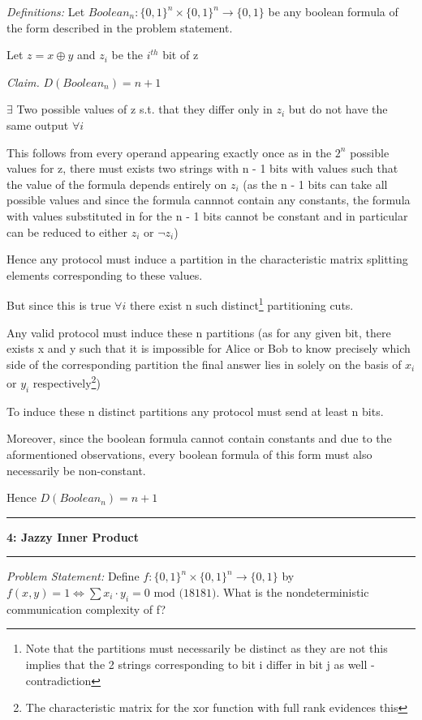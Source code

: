 \documentclass[11pt]{article}
\newcommand\question[2]{\vspace{.25in}\hrule\textbf{#1: #2}\vspace{.5em}\hrule\vspace{.10in}}
\newcommand\problem{\emph{Problem Statement:}\newline}
\newcommand\definitions{\emph{Definitions:}\newline}
\newcommand\claim{\emph{Claim.}\newline}
\begin{document}
\definitions
Let $Boolean_n: {\{0, 1\}}^n \times {\{0, 1\}}^n \to \{0, 1\}$ be any boolean formula of the form described in the problem statement. 

Let $z = x \oplus y$ and $z_i$ be the $i^{th}$ bit of z

\claim
$D(Boolean_n) = n + 1$ 

\proof 
$\exists$ Two possible values of z s.t. that they differ only in $z_i$ but do not have the same output $\forall i$

This follows from every operand appearing exactly once as in the $2^n$ possible values for z, there must exists two strings with n - 1 bits with values such that the value of the formula depends entirely on $z_i$ (as the n - 1 bits can take all possible values and since the formula cannnot contain any constants, the formula with values substituted in for the n - 1 bits cannot be constant and in particular can be reduced to either $z_i$ or $\lnot z_i$)

Hence any protocol must induce a partition in the characteristic matrix splitting elements corresponding to these values.

But since this is true $\forall i$ there exist n such distinct\footnote{Note that the partitions must necessarily be distinct as they are not this implies that the 2 strings corresponding to bit i differ in bit j as well - contradiction} partitioning cuts. 

Any valid protocol must induce these n partitions (as for any given bit, there exists x and y such that it is impossible for Alice or Bob to know precisely which side of the corresponding partition the final answer lies in solely on the basis of $x_i$ or $y_i$ respectively\footnote{The characteristic matrix for the xor function with full rank evidences this})

To induce these n distinct partitions any protocol must send at least n bits.

Moreover, since the boolean formula cannot contain constants and due to the aformentioned observations, every boolean formula of this form must also necessarily be non-constant. 

Hence $D(Boolean_n) = n + 1$ 

\newpage

\question{4}{Jazzy Inner Product}

\problem
Define $f: {\{0, 1\}}^n \times {\{0, 1\}}^n \to \{0, 1\}$ by $f(x, y) = 1 \iff \sum{x_i \cdot y_i} = 0 \text{ mod (18181)}.$ What is the nondeterministic communication complexity of f?
\end{document}
